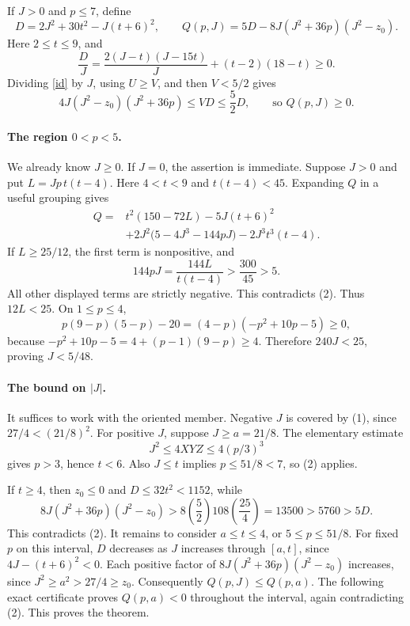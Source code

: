 \documentclass[11pt]{article}
\begin{document}
If $J>0$ and $p\le7$, define
\[
 D=2J^2+30t^2-J(t+6)^2,\qquad
 Q(p,J)=5D-8J(J^2+36p)(J^2-z_0).
\]
Here $2\le t\le9$, and
\[
 \frac D J=\frac{2(J-t)(J-15t)}J+(t-2)(18-t)\ge0.
\]
Dividing \eqref{id} by $J$, using $U\ge V$, and then $V<5/2$ gives
\[
 4J(J^2-z_0)(J^2+36p)\le VD\le\frac52D,
 \qquad\text{so }Q(p,J)\ge0.\tag{2}
\]

\paragraph{The region $0<p<5$.}
We already know $J\ge0$. If $J=0$, the assertion is immediate.
Suppose $J>0$ and put $L=Jp\,t(t-4)$. Here $4<t<9$ and
$t(t-4)<45$. Expanding $Q$ in a useful grouping gives
\begin{align*}
 Q={}&t^2(150-72L)-5J(t+6)^2\\
 &+2J^2\bigl(5-4J^3-144pJ\bigr)-2J^3t^3(t-4).
\end{align*}
If $L\ge25/12$, the first term is nonpositive, and
\[
 144pJ=\frac{144L}{t(t-4)}>\frac{300}{45}>5.
\]
All other displayed terms are strictly negative. This contradicts (2).
Thus $12L<25$. On $1\le p\le4$,
\[
 p(9-p)(5-p)-20=(4-p)(-p^2+10p-5)\ge0,
\]
because $-p^2+10p-5=4+(p-1)(9-p)\ge4$.
Therefore $240J<25$, proving $J<5/48$.

\paragraph{The bound on $|J|$.}
It suffices to work with the oriented member. Negative $J$ is covered
by (1), since $27/4<(21/8)^2$. For positive $J$, suppose
$J\ge a=21/8$. The elementary estimate
\[
 J^2\le4XYZ\le4(p/3)^3
\]
gives $p>3$, hence $t<6$. Also $J\le t$ implies $p\le51/8<7$,
so (2) applies.

If $t\ge4$, then $z_0\le0$ and $D\le32t^2<1152$, while
\[
 8J(J^2+36p)(J^2-z_0)
 >8\left(\frac52\right)108\left(\frac{25}{4}\right)
 =13500>5760>5D.
\]
This contradicts (2). It remains to consider $a\le t\le4$, or
$5\le p\le51/8$.
For fixed $p$ on this interval, $D$ decreases as $J$ increases through
$[a,t]$, since $4J-(t+6)^2<0$. Each positive factor of
$8J(J^2+36p)(J^2-z_0)$ increases, since
$J^2\ge a^2>27/4\ge z_0$.
Consequently $Q(p,J)\le Q(p,a)$.
The following exact certificate proves $Q(p,a)<0$ throughout the interval,
again contradicting (2). This proves the theorem.
\end{document}
